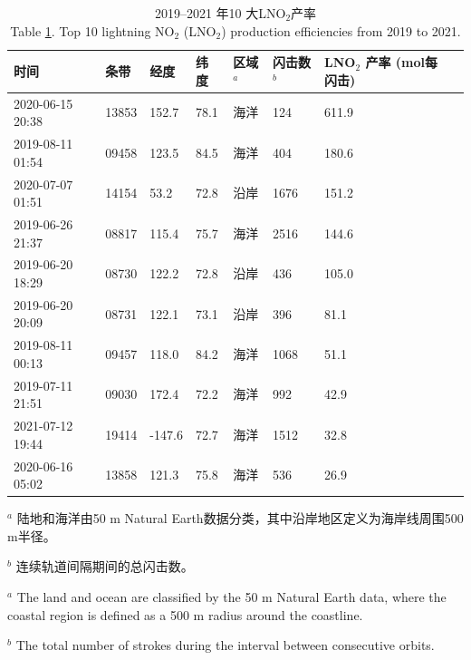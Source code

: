 \begin{table}[!htbp]
\centering
\caption{2019--2021 年10 大LNO$_2$产率 \\
Table \ref{table:arctic_pe_lno2}.
Top 10 lightning NO$_2$ (LNO$_2$) production efficiencies from 2019 to 2021.}
\label{table:arctic_pe_lno2}
\footnotesize
{\centering
\begin{tabular}{llllllll}
\hline
时间 &       条带 &   经度 &   纬度 &
区域$^a$ &
闪击数$^b$  & \shortstack{LNO$_2$ 产率 \\ (mol每闪击)} \\
\hline
2020-06-15 20:38 &  13853 &      152.7 &      78.1 &       海洋 &         124 &    611.9 \\
2019-08-11 01:54 &  09458 &      123.5 &      84.5 &       海洋 &         404 &    180.6 \\
2020-07-07 01:51 &  14154 &       53.2 &      72.8 &       沿岸 &        1676 &    151.2 \\
2019-06-26 21:37 &  08817 &      115.4 &      75.7 &       海洋 &        2516 &    144.6 \\
2019-06-20 18:29 &  08730 &      122.2 &      72.8 &       沿岸 &         436 &    105.0 \\
2019-06-20 20:09 &  08731 &      122.1 &      73.1 &       沿岸 &         396 &     81.1 \\
2019-08-11 00:13 &  09457 &      118.0 &      84.2 &       海洋 &        1068 &     51.1 \\
2019-07-11 21:51 &  09030 &      172.4 &      72.2 &       海洋 &         992 &     42.9 \\
2021-07-12 19:44 &  19414 &     -147.6 &      72.7 &       海洋 &        1512 &     32.8 \\
2020-06-16 05:02 &  13858 &      121.3 &      75.8 &       海洋 &         536 &     26.9 \\
\hline
\end{tabular}
\par }
\begin{tablenotes}
\footnotesize
\item $^a$ 陆地和海洋由50 m Natural Earth数据分类，其中沿岸地区定义为海岸线周围500 m半径。
\item $^b$ 连续轨道间隔期间的总闪击数。
\item $^a$ The land and ocean are classified by the 50 m Natural Earth data, where the coastal region is defined as a 500 m radius around the coastline.
\item $^b$ The total number of strokes during the interval between consecutive orbits.
\end{tablenotes}
\end{table}


